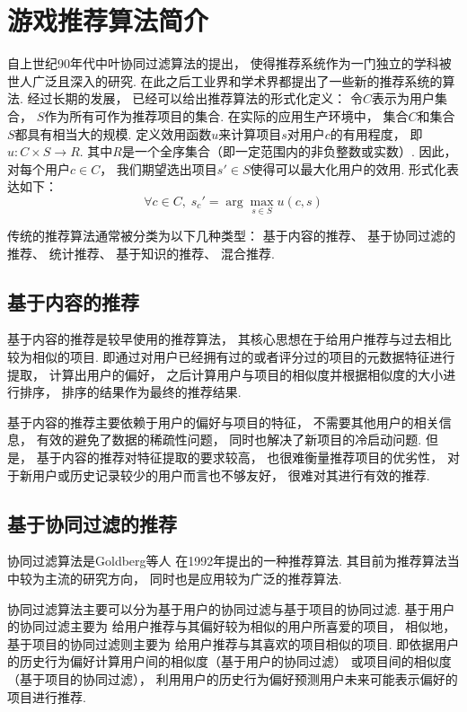 \section{游戏推荐算法简介}

自上世纪90年代中叶协同过滤算法的提出\cite{adomaviciusNextGenerationRecommender2005}，
使得推荐系统作为一门独立的学科被世人广泛且深入的研究.
在此之后工业界和学术界都提出了一些新的推荐系统的算法.
经过长期的发展，
已经可以给出推荐算法的形式化定义：
令$C$表示为用户集合，
$S$作为所有可作为推荐项目的集合.
在实际的应用生产环境中，
集合$C$和集合$S$都具有相当大的规模.
定义效用函数$u$来计算项目$s$对用户$c$的有用程度，
即$u:C\times S\rightarrow R$.
其中$R$是一个全序集合（即一定范围内的非负整数或实数）.
因此，
对每个用户$c\in C$，
我们期望选出项目$s'\in S$使得可以最大化用户的效用.
形式化表达如下：
\begin{equation}
    \forall c\in C,\; s_c'=\arg \max_{s\in S} u(c,s)
\end{equation}

传统的推荐算法通常被分类为以下几种类型\cite{canoHybridRecommenderSystems2017}：
基于内容的推荐、
基于协同过滤的推荐、
统计推荐、
基于知识的推荐、
混合推荐.

\subsection{基于内容的推荐}

基于内容的推荐是较早使用的推荐算法，
其核心思想在于给用户推荐与过去相比较为相似的项目.
即通过对用户已经拥有过的或者评分过的项目的元数据特征进行提取，
计算出用户的偏好，
之后计算用户与项目的相似度并根据相似度的大小进行排序，
排序的结果作为最终的推荐结果.

基于内容的推荐主要依赖于用户的偏好与项目的特征，
不需要其他用户的相关信息，
有效的避免了数据的稀疏性问题，
同时也解决了新项目的冷启动问题.
但是，
基于内容的推荐对特征提取的要求较高，
也很难衡量推荐项目的优劣性，
对于新用户或历史记录较少的用户而言也不够友好，
很难对其进行有效的推荐.

\subsection{基于协同过滤的推荐}

协同过滤算法是Goldberg等人\cite{goldbergUsingCollaborativeFiltering1992}
在1992年提出的一种推荐算法.
其目前为推荐算法当中较为主流的研究方向，
同时也是应用较为广泛的推荐算法.

协同过滤算法主要可以分为基于用户的协同过滤与基于项目的协同过滤.
基于用户的协同过滤主要为
给用户推荐与其偏好较为相似的用户所喜爱的项目，
相似地，
基于项目的协同过滤则主要为
给用户推荐与其喜欢的项目相似的项目.
即依据用户的历史行为偏好计算用户间的相似度（基于用户的协同过滤）
或项目间的相似度（基于项目的协同过滤），
利用用户的历史行为偏好预测用户未来可能表示偏好的项目进行推荐.

